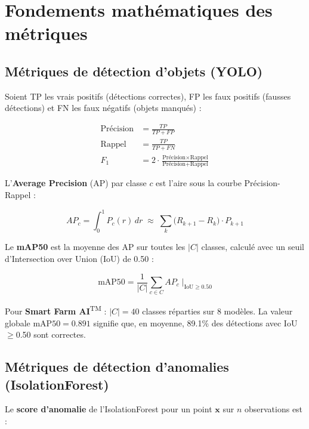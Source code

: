 \documentclass[12pt,a4paper,oneside]{report}
\newcommand{\farmAI}{\textbf{Smart Farm AI}\textsuperscript{TM}}
\begin{document}
\section{Fondements mathématiques des métriques}

\subsection{Métriques de détection d'objets (YOLO)}

Soient TP les vrais positifs (détections correctes), FP les faux positifs (fausses
détections) et FN les faux négatifs (objets manqués) :

\begin{align}
\text{Précision} &= \frac{TP}{TP + FP} \label{eq:precision}\\[4pt]
\text{Rappel}    &= \frac{TP}{TP + FN}  \label{eq:recall}\\[4pt]
F_1              &= 2 \cdot \frac{\text{Précision} \times \text{Rappel}}{\text{Précision} + \text{Rappel}} \label{eq:f1}
\end{align}

L'\textbf{Average Precision} (AP) par classe $c$ est l'aire sous la courbe
Précision-Rappel :

\begin{equation}
AP_c = \int_0^1 P_c(r)\,dr \;\approx\; \sum_{k} \bigl(R_{k+1} - R_k\bigr) \cdot P_{k+1}
\label{eq:ap}
\end{equation}

Le \textbf{mAP50} est la moyenne des AP sur toutes les $|C|$ classes, calculé avec
un seuil d'Intersection over Union (IoU) de 0.50 :

\begin{equation}
\boxed{
\text{mAP50} = \frac{1}{|C|} \sum_{c \in C} AP_c \;\Big|_{\text{IoU} \geq 0.50}
}
\label{eq:map50}
\end{equation}

Pour \farmAI{} : $|C| = 40$ classes réparties sur 8 modèles. La valeur globale
$\text{mAP50} = 0.891$ signifie que, en moyenne, 89.1\% des détections avec IoU$\geq$0.50
sont correctes.

\subsection{Métriques de détection d'anomalies (IsolationForest)}

Le \textbf{score d'anomalie} de l'IsolationForest pour un point $\mathbf{x}$ sur $n$
observations est :
\end{document}
